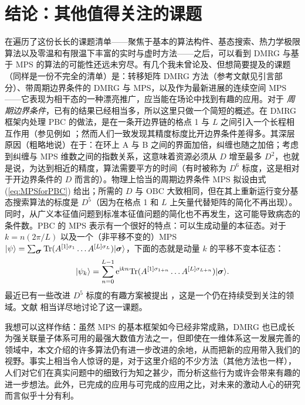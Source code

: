 \documentclass[a4paper,10pt,oneside,onecolumn,1p,times]{elsarticle}
\newcommand{\tr}{{\rm Tr }}
\newcommand{\eul}{{\rm e }}
\newcommand{\imag}{{\rm i }}
\newcommand{\ket}[1]{\mbox{$| #1  \rangle$}}
\newcommand{\fat}[1]{\mbox{\boldmath$#1$\unboldmath}}	%
\begin{document}
\section{结论：其他值得关注的课题}
在遍历了这份长长的课题清单——聚焦于基本的算法构件、基态搜索、热力学极限算法以及零温和有限温下丰富的实时与虚时方法——之后，可以看到 DMRG 与基于 MPS 的算法的可能性还远未穷尽。有几个我未曾论及、但想简要提及的课题（同样是一份不完全的清单）是：转移矩阵 DMRG 方法（参考文献见引言部分）、带周期边界条件的 DMRG 与 MPS，以及作为最新进展的连续空间 MPS\cite{Verstraete10}——它表现为相干态的一种漂亮推广，应当能在场论中找到有趣的应用。对于 {\em 周期边界条件}，已有的结果已经相当多，所以这里只做一个简短的概述。在 DMRG 框架内处理 PBC 的做法，是在一条开边界链的格点 1 与 $L$ 之间引入一个长程相互作用（参见例如 \cite{Schmitteckert96,Rapsch99,Meden03a,Meden03b}；然而人们一致发现其精度标度比开边界条件差得多。其深层原因（粗略地说）在于：在环上 A 与 B 之间的界面加倍，纠缠也随之加倍；考虑到纠缠与 MPS 维数之间的指数关系，这意味着资源必须从 $D$ 增至最多 $D^2$，也就是说，为达到相近的精度，算法需要平方的时间（有时被称为 $D^6$ 标度，这是相对于开边界条件的 $D$ 而言的）。物理上恰当的周期边界条件 MPS 拟设由式 (\ref{eq:MPSforPBC}) 给出；所需的 $D$ 与 OBC 大致相同，但在其上重新运行变分基态搜索算法的标度是 $D^5$（因为在格点 1 和 $L$ 上矢量代替矩阵的简化不再出现）\cite{VerstraetePorras04}。同时，从广义本征值问题到标准本征值问题的简化也不再发生，这可能导致病态的条件数。PBC 的 MPS 表示有一个很好的特点：可以生成动量的本征态。对于 $k = n (2\pi/L)$ 以及一个（非平移不变的）MPS $\ket{\psi} = \sum_{{\fat{\sigma}}} \tr (A^{[1]\sigma_1} \ldots A^{[L]\sigma_L}) \ket{\fat{\sigma}}$，下面的态就是动量 $k$ 的平移不变本征态：\cite{Porras06}
\begin{equation}
\ket{\psi_k} = \sum_{n=0}^{L-1} \eul^{\imag k n}  \tr (A^{[1]\sigma_{1+n}} \ldots A^{[L]\sigma_{L+n}}) \ket{\fat{\sigma}} .
\end{equation}
最近已有一些改进 $D^5$ 标度的有趣方案被提出 \cite{Pippan10,Pirvu10}，这是一个仍在持续受到关注的领域。文献 \cite{VerstraeteMurg08} 相当详尽地讨论了这一课题。

我想可以这样作结：虽然 MPS 的基本框架如今已经非常成熟，DMRG 也已成长为强关联量子体系可用的最强大数值方法之一，但即使在一维体系这一发展完善的领域中，本文介绍的许多算法仍有进一步改进的余地，从而把新的应用带入我们的视野。事实上相当令人惊讶的是，对于这里介绍的不少方法（其他方法也一样），人们对它们在真实问题中的细致行为知之甚少，而分析这些行为或许会带来有趣的进一步想法。此外，已完成的应用与可完成的应用之比，对未来的激动人心的研究而言似乎十分有利。
\end{document}
